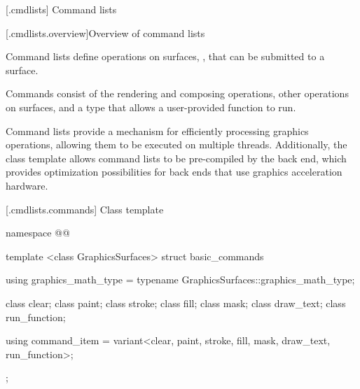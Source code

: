 
 [\iotwod.cmdlists] {Command lists}

 [\iotwod.cmdlists.overview]{Overview of command lists}

\pnum
Command lists define operations on surfaces, , that can be submitted to a surface.

\pnum
Commands consist of the rendering and composing operations, other operations on surfaces, and a type that allows a user-provided function to run.

\pnum
Command lists provide a mechanism for efficiently processing graphics operations, allowing them to be executed on multiple threads. Additionally, the  class template allows command lists to be pre-compiled by the back end, which provides optimization possibilities for back ends that use graphics acceleration hardware.

 [\iotwod.cmdlists.commands] {Class template }

\addtocounter{SectionDepthBase}{2}
%

%
%






\addtocounter{SectionDepthBase}{-2}

\addtocounter{SectionDepthBase}{1}

\addtocounter{SectionDepthBase}{-1}

\begin{codeblock}
namespace @\fullnamespace{}@ {
  template <class GraphicsSurfaces>
  struct basic_commands {
    using graphics_math_type = typename GraphicsSurfaces::graphics_math_type;

    class clear;
    class paint;
    class stroke;
    class fill;
    class mask;
    class draw_text;
    class run_function;
  }
  using command_item = variant<clear, paint, stroke, fill, mask, draw_text, 
    run_function>;
};
\end{codeblock}
